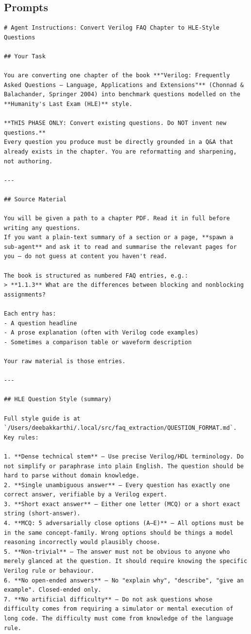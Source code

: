 \documentclass[letterpaper, 12pt]{article}
\begin{document}
\begin{appendices}

	\section{Prompts}
	\label{sec:a_prompts}

\begin{verbatim}
# Agent Instructions: Convert Verilog FAQ Chapter to HLE-Style Questions

## Your Task

You are converting one chapter of the book **"Verilog: Frequently Asked Questions — Language, Applications and Extensions"** (Chonnad & Balachander, Springer 2004) into benchmark questions modelled on the **Humanity's Last Exam (HLE)** style.

**THIS PHASE ONLY: Convert existing questions. Do NOT invent new questions.**
Every question you produce must be directly grounded in a Q&A that already exists in the chapter. You are reformatting and sharpening, not authoring.

---

## Source Material

You will be given a path to a chapter PDF. Read it in full before writing any questions.
If you want a plain-text summary of a section or a page, **spawn a sub-agent** and ask it to read and summarise the relevant pages for you — do not guess at content you haven't read.

The book is structured as numbered FAQ entries, e.g.:
> **1.1.3** What are the differences between blocking and nonblocking assignments?

Each entry has:
- A question headline
- A prose explanation (often with Verilog code examples)
- Sometimes a comparison table or waveform description

Your raw material is those entries.

---

## HLE Question Style (summary)

Full style guide is at `/Users/deebakkarthi/.local/src/faq_extraction/QUESTION_FORMAT.md`. Key rules:

1. **Dense technical stem** — Use precise Verilog/HDL terminology. Do not simplify or paraphrase into plain English. The question should be hard to parse without domain knowledge.
2. **Single unambiguous answer** — Every question has exactly one correct answer, verifiable by a Verilog expert.
3. **Short exact answer** — Either one letter (MCQ) or a short exact string (short-answer).
4. **MCQ: 5 adversarially close options (A–E)** — All options must be in the same concept-family. Wrong options should be things a model reasoning incorrectly would plausibly choose.
5. **Non-trivial** — The answer must not be obvious to anyone who merely glanced at the question. It should require knowing the specific Verilog rule or behaviour.
6. **No open-ended answers** — No "explain why", "describe", "give an example". Closed-ended only.
7. **No artificial difficulty** — Do not ask questions whose difficulty comes from requiring a simulator or mental execution of long code. The difficulty must come from knowledge of the language rule.


\end{verbatim}
\end{appendices}
\end{document}
